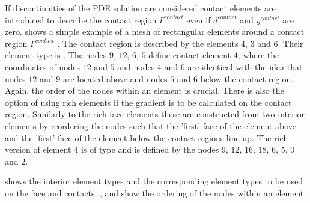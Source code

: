 If discontinuities of the PDE solution are considered contact elements 
 are introduced to describe the contact region $\Gamma^{contact}$ 
even if $d^{contact}$ and $y^{contact}$ are zero.  shows a simple example of a mesh
of rectangular elements around a contact region $\Gamma^{contact}$ . 
The contact region is described by the
elements $4$, $3$ and $6$. Their element type is . 
The nodes $9$, $12$, $6$, $5$ define contact element $4$, where the coordinates of nodes $12$ and $5$ and
nodes $4$ and $6$ are identical with the idea that nodes $12$ and $9$ are located above and 
nodes $5$ and $6$ below the contact region.  
Again, the order of the nodes within an element is crucial. There is also the option of using rich elements
if the gradient is to be calculated on the contact region. Similarly to the rich face elements 
these are constructed from two interior elements by reordering the nodes such that
the 'first' face of the element above and the 'first' face of the element below the 
contact regions line up.  The rich version of element 
$4$ is of type  and is defined by the nodes $9$, $12$, $16$, $18$, $6$, $5$, $0$ and 
$2$.

 shows the interior element types and the corresponding element types to be used
on the face and contacts. ,  and  show the ordering of
the nodes within an element.

